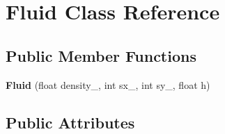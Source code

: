 \hypertarget{classFluid}{}\section{Fluid Class Reference}
\label{classFluid}
\subsection*{Public Member Functions}
\begin{DoxyCompactItemize}
\item 
\mbox{\label{classFluid_a9c6c497333b67051ae7d9c209acff5de}} 
{\bfseries Fluid} (float density\+\_\+, int sx\+\_\+, int sy\+\_\+, float h)
\end{DoxyCompactItemize}
\subsection*{Public Attributes}
